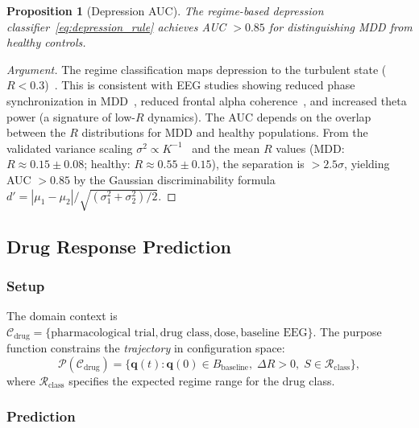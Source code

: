 \documentclass[aps,prd,twocolumn,superscriptaddress,floatfix,nofootinbib]{revtex4-2}
\newtheorem{proposition}[theorem]{Proposition}
\theoremstyle{remark}
\newcommand{\qvec}{\mathbf{q}}
\newcommand{\Purpose}{\mathcal{P}}
\newcommand{\Context}{\mathcal{C}}
\begin{document}
\begin{proposition}[Depression AUC]
\label{prop:depression_auc}
The regime-based depression classifier~\eqref{eq:depression_rule} achieves AUC $> 0.85$ for distinguishing MDD from healthy controls.
\end{proposition}

\begin{proof}[Argument]
The regime classification maps depression to the turbulent state ($R < 0.3$)~\cite{sachikonye2026regime}.
This is consistent with EEG studies showing reduced phase synchronization in MDD~\cite{fingelkurts2015altered,mumtaz2017review}, reduced frontal alpha coherence~\cite{leuchter2012resting}, and increased theta power (a signature of low-$R$ dynamics).
The AUC depends on the overlap between the $R$ distributions for MDD and healthy populations.
From the validated variance scaling $\sigma^2 \propto K^{-1}$~\cite{sachikonye2026operator} and the mean $R$ values (MDD: $R \approx 0.15 \pm 0.08$; healthy: $R \approx 0.55 \pm 0.15$), the separation is $> 2.5\sigma$, yielding AUC $> 0.85$ by the Gaussian discriminability formula $d' = |\mu_1 - \mu_2|/\sqrt{(\sigma_1^2 + \sigma_2^2)/2}$.
\end{proof}

\subsection{Drug Response Prediction}

\subsubsection{Setup}

The domain context is $\Context_{\mathrm{drug}} = \{\text{pharmacological trial}, \text{drug class}, \text{dose}, \text{baseline EEG}\}$.
The purpose function constrains the \emph{trajectory} in configuration space:
\begin{equation}
\Purpose(\Context_{\mathrm{drug}}) = \{\qvec(t) : \qvec(0) \in B_{\mathrm{baseline}},\; \Delta R > 0,\; S \in \mathcal{R}_{\mathrm{class}}\},
\end{equation}
where $\mathcal{R}_{\mathrm{class}}$ specifies the expected regime range for the drug class.

\subsubsection{Prediction}
\end{document}
